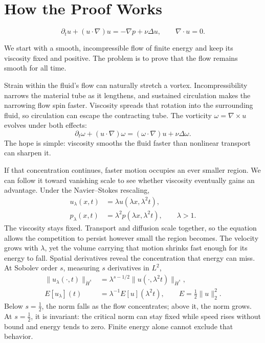\begingroup
\setlength{\parindent}{0pt}
\setlength{\parskip}{0.40\baselineskip}
\setlength{\abovedisplayskip}{6.5pt plus 1.5pt minus 1.5pt}
\setlength{\belowdisplayskip}{6.5pt plus 1.5pt minus 1.5pt}
\setlength{\jot}{5pt}

\section*{How the Proof Works}

\[
 \partial_tu+(u\cdot\nabla)u=-\nabla p+\nu\Delta u,\qquad \nabla\cdot u=0.
\]

We start with a smooth, incompressible flow of finite energy and keep its
viscosity fixed and positive. The problem is to prove that the flow remains
smooth for all time.

Strain within the fluid's flow can naturally stretch a vortex. Incompressibility
narrows the material tube as it lengthens, and sustained circulation makes the
narrowing flow spin faster. Viscosity spreads that rotation into the surrounding
fluid, so circulation can escape the contracting tube. The vorticity
\(\omega=\nabla\times u\) evolves under both effects:
\[
 \partial_t\omega+(u\cdot\nabla)\omega
 =(\omega\cdot\nabla)u+\nu\Delta\omega.
\]
The hope is simple: viscosity smooths the fluid faster than nonlinear
transport can sharpen it.

If that concentration continues, faster motion occupies an ever smaller
region. We can follow it toward vanishing scale to see whether viscosity
eventually gains an advantage. Under the Navier--Stokes rescaling,
\[
 \begin{aligned}
 u_\lambda(x,t)&=\lambda u(\lambda x,\lambda^2t),\\
 p_\lambda(x,t)&=\lambda^2p(\lambda x,\lambda^2t),
 \qquad \lambda>1.
 \end{aligned}
\]
The viscosity stays fixed. Transport and diffusion scale together, so the
equation allows the competition to persist however small the region becomes.
The velocity grows with \(\lambda\), yet the volume carrying that motion
shrinks fast enough for its energy to fall. Spatial derivatives reveal the
concentration that energy can miss. At Sobolev order \(s\), measuring \(s\)
derivatives in \(L^2\),
\[
 \begin{aligned}
 \|u_\lambda(\cdot,t)\|_{\dot H^s}
 &=\lambda^{s-1/2}\|u(\cdot,\lambda^2t)\|_{\dot H^s},\\
 E[u_\lambda](t)&=\lambda^{-1}E[u](\lambda^2t),
 \qquad E=\tfrac12\|u\|_2^2.
 \end{aligned}
\]
Below \(s=\tfrac12\), the norm falls as the flow concentrates; above it,
the norm grows. At \(s=\tfrac12\), it is invariant: the critical norm can
stay fixed while speed rises without bound and energy tends to zero.
Finite energy alone cannot exclude that behavior.

